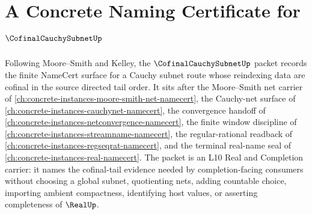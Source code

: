 \chapter{A Concrete Naming Certificate for $\CofinalCauchySubnetUp$}
\label{ch:concrete-instances-cofinal-cauchy-subnet-namecert}

Following Moore--Smith and Kelley, the $\CofinalCauchySubnetUp$ packet records the finite NameCert surface for a Cauchy subnet route whose reindexing data are cofinal in the source directed tail order. It sits after the Moore--Smith net carrier of \autoref{ch:concrete-instances-moore-smith-net-namecert}, the Cauchy-net surface of \autoref{ch:concrete-instances-cauchynet-namecert}, the convergence handoff of \autoref{ch:concrete-instances-netconvergence-namecert}, the finite window discipline of \autoref{ch:concrete-instances-streamname-namecert}, the regular-rational readback of \autoref{ch:concrete-instances-regseqrat-namecert}, and the terminal real-name seal of \autoref{ch:concrete-instances-real-namecert}. The packet is an L10 Real and Completion carrier: it names the cofinal-tail evidence needed by completion-facing consumers without choosing a global subnet, quotienting nets, adding countable choice, importing ambient compactness, identifying host values, or asserting completeness of $\RealUp$.

